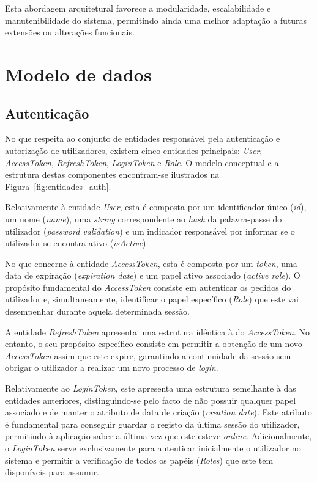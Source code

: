 Esta abordagem arquitetural favorece a modularidade, escalabilidade e manutenibilidade do sistema, permitindo ainda uma melhor adaptação a futuras extensões ou alterações funcionais.


\cleardoublepage
\section{Modelo de dados}
\subsection{Autenticação}

No que respeita ao conjunto de entidades responsável pela autenticação e autorização de utilizadores, existem cinco entidades principais: \textit{User}, \textit{AccessToken}, \textit{RefreshToken}, \textit{LoginToken} e \textit{Role}. O modelo conceptual e a estrutura destas componentes encontram-se ilustrados na Figura~\ref{fig:entidades_auth}.

Relativamente à entidade \textit{User}, esta é composta por um identificador único (\textit{id}), um nome (\textit{name}), uma \textit{string} correspondente ao \textit{hash} da palavra-passe do utilizador (\textit{password validation}) e um indicador responsável por informar se o utilizador se encontra ativo (\textit{isActive}).

No que concerne à entidade \textit{AccessToken}, esta é composta por um \textit{token}, uma data de expiração (\textit{expiration date}) e um papel ativo associado (\textit{active role}). O propósito fundamental do \textit{AccessToken} consiste em autenticar os pedidos do utilizador e, simultaneamente, identificar o papel específico (\textit{Role}) que este vai desempenhar durante aquela determinada sessão.

A entidade \textit{RefreshToken} apresenta uma estrutura idêntica à do \textit{AccessToken}. No entanto, o seu propósito específico consiste em permitir a obtenção de um novo \textit{AccessToken} assim que este expire, garantindo a continuidade da sessão sem obrigar o utilizador a realizar um novo processo de \textit{login}.

Relativamente ao \textit{LoginToken}, este apresenta uma estrutura semelhante à das entidades anteriores, distinguindo-se pelo facto de não possuir qualquer papel associado e de manter o atributo de data de criação (\textit{creation date}). Este atributo é fundamental para conseguir guardar o registo da última sessão do utilizador, permitindo à aplicação saber a última vez que este esteve \textit{online}. Adicionalmente, o \textit{LoginToken} serve exclusivamente para autenticar inicialmente o utilizador no sistema e permitir a verificação de todos os papéis (\textit{Roles}) que este tem disponíveis para assumir.

